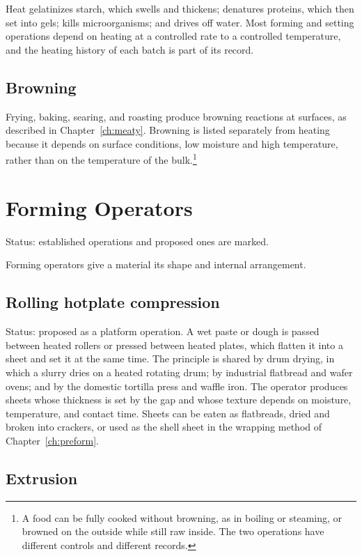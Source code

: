\documentclass[11pt,openany]{book}
\theoremstyle{definition}
\begin{document}
Heat gelatinizes starch, which swells and thickens; denatures proteins, which then set into gels; kills microorganisms; and drives off water. Most forming and setting operations depend on heating at a controlled rate to a controlled temperature, and the heating history of each batch is part of its record.

\section{Browning}

Frying, baking, searing, and roasting produce browning reactions at surfaces, as described in Chapter~\ref{ch:meaty}. Browning is listed separately from heating because it depends on surface conditions, low moisture and high temperature, rather than on the temperature of the bulk.\footnote{A food can be fully cooked without browning, as in boiling or steaming, or browned on the outside while still raw inside. The two operations have different controls and different records.}

\chapter{Forming Operators}\label{ch:forming}

Status: established operations and proposed ones are marked.

Forming operators give a material its shape and internal arrangement.

\section{Rolling hotplate compression}

Status: proposed as a platform operation. A wet paste or dough is passed between heated rollers or pressed between heated plates, which flatten it into a sheet and set it at the same time. The principle is shared by drum drying, in which a slurry dries on a heated rotating drum; by industrial flatbread and wafer ovens; and by the domestic tortilla press and waffle iron. The operator produces sheets whose thickness is set by the gap and whose texture depends on moisture, temperature, and contact time. Sheets can be eaten as flatbreads, dried and broken into crackers, or used as the shell sheet in the wrapping method of Chapter~\ref{ch:preform}.

\section{Extrusion}
\end{document}
